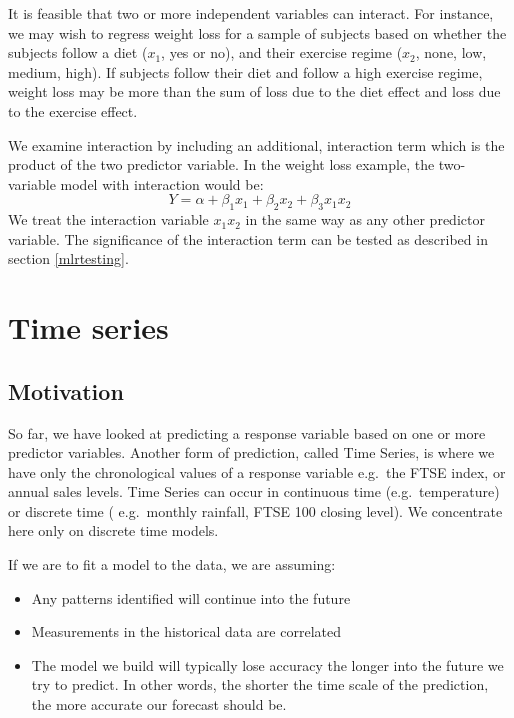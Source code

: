 \documentclass[12pt,a4paper,openany,twoside]{report}
\theoremstyle{definition}
\theoremstyle{remark}
\theoremstyle{plain}
\theoremstyle{definition}
\theoremstyle{definition}
\theoremstyle{definition}
\theoremstyle{remark}
\begin{document}
It is feasible that two or more independent variables can interact. For
instance, we may wish to regress weight loss for a sample of subjects
based on whether the subjects follow a diet (\(x_{1}\), yes or no), and
their exercise regime (\(x_{2}\), none, low, medium, high). If subjects
follow their diet and follow a high exercise regime, weight loss may be
more than the sum of loss due to the diet effect and loss due to the
exercise effect.

We examine interaction by including an additional, interaction term
which is the product of the two predictor variable. In the weight loss
example, the two-variable model with interaction would be:
\[Y = \alpha + \beta_{1}x_{1} + \beta_{2}x_{2} + \beta_{3}x_{1}x_{2}\]
We treat the interaction variable \(x_{1}x_{2}\) in the same way as any
other predictor variable. The significance of the interaction term can
be tested as described in section \ref{mlrtesting}.

\hypertarget{timeseries}{%
\chapter{Time series}\label{timeseries}}

\hypertarget{tsmotivation}{%
\section{Motivation}\label{tsmotivation}}

So far, we have looked at predicting a response variable based on one or
more predictor variables. Another form of prediction, called Time
Series, is where we have only the chronological values of a response
variable e.g.~the FTSE index, or annual sales levels. Time Series can
occur in continuous time (e.g.~temperature) or discrete time (
e.g.~monthly rainfall, FTSE 100 closing level). We concentrate here only on
discrete time models.

If we are to fit a model to the data, we are assuming:

\begin{itemize}
\item
  Any patterns identified will continue into the future
\item
  Measurements in the historical data are correlated
\item
  The model we build will typically lose accuracy the longer into the
  future we try to predict. In other words, the shorter the time scale
  of the prediction, the more accurate our forecast should be.
\end{itemize}
\end{document}
